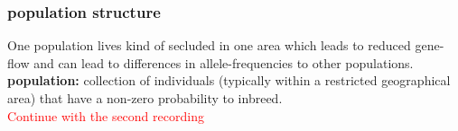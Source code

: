 \documentclass{article}
\begin{document}
\subsubsection{population structure}
One population lives kind of secluded in one area which leads to reduced gene-flow and can lead to differences in allele-frequencies to other populations.\\
\textbf{population:} collection of individuals (typically within a restricted geographical area) that have a non-zero probability to inbreed.\\

\LARGE{\textcolor{red}{Continue with the second recording}}
\end{document}
